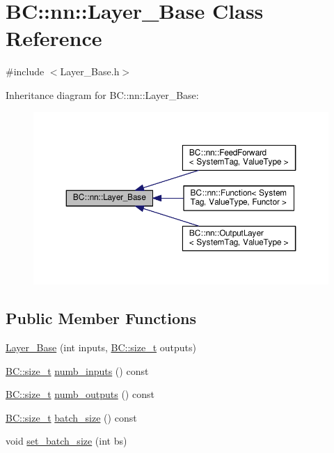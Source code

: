 \hypertarget{classBC_1_1nn_1_1Layer__Base}{}\section{BC\+:\+:nn\+:\+:Layer\+\_\+\+Base Class Reference}
\label{classBC_1_1nn_1_1Layer__Base}


{\ttfamily \#include $<$Layer\+\_\+\+Base.\+h$>$}



Inheritance diagram for BC\+:\+:nn\+:\+:Layer\+\_\+\+Base\+:
\nopagebreak
\begin{figure}[H]
\begin{center}
\leavevmode
\includegraphics[width=350pt]{classBC_1_1nn_1_1Layer__Base__inherit__graph}
\end{center}
\end{figure}
\subsection*{Public Member Functions}
\begin{DoxyCompactItemize}
\item 
\hyperlink{classBC_1_1nn_1_1Layer__Base_af3f109f107af72f2efd7656ead043f25}{Layer\+\_\+\+Base} (int inputs, \hyperlink{namespaceBC_a6007cbc4eeec401a037b558910a56173}{B\+C\+::size\+\_\+t} outputs)
\item 
\hyperlink{namespaceBC_a6007cbc4eeec401a037b558910a56173}{B\+C\+::size\+\_\+t} \hyperlink{classBC_1_1nn_1_1Layer__Base_af278d325099ce308a81dae31aa724ba9}{numb\+\_\+inputs} () const 
\item 
\hyperlink{namespaceBC_a6007cbc4eeec401a037b558910a56173}{B\+C\+::size\+\_\+t} \hyperlink{classBC_1_1nn_1_1Layer__Base_a6827a83116d7b59492ac54b15d670d46}{numb\+\_\+outputs} () const 
\item 
\hyperlink{namespaceBC_a6007cbc4eeec401a037b558910a56173}{B\+C\+::size\+\_\+t} \hyperlink{classBC_1_1nn_1_1Layer__Base_ae16b730f08af04a8ee31f16c411fca3c}{batch\+\_\+size} () const 
\item 
void \hyperlink{classBC_1_1nn_1_1Layer__Base_a63f6ef50e317fad3c367817eba5194fe}{set\+\_\+batch\+\_\+size} (int bs)
\end{DoxyCompactItemize}


